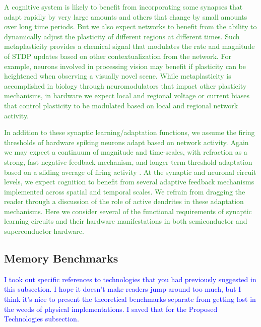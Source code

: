 \documentclass[twocolumn]{article}
\begin{document}
\textcolor{ForestGreen}{A cognitive system is likely to benefit from incorporating some synapses that adapt rapidly by very large amounts and others that change by small amounts over long time periods. But we also expect networks to benefit from the ability to dynamically adjust the plasticity of different regions at different times. Such metaplasticity provides a chemical signal that modulates the rate and magnitude of STDP updates based on other contextualization from the network. For example, neurons involved in processing vision may benefit if plasticity can be heightened when observing a visually novel scene. While metaplasticity is accomplished in biology through neuromodulators that impact other plasticity mechanisms, in hardware we expect local and regional voltage or current biases that control plasticity to be modulated based on local and regional network activity.}

\textcolor{ForestGreen}{In addition to these synaptic learning/adaptation functions, we assume the firing thresholds of hardware spiking neurons adapt based on network activity. Again we may expect a continuum of magnitude and time-scales, with refraction as a strong, fast negative feedback mechanism, and longer-term threshold adaptation based on a sliding average of firing activity \cite{}. At the synaptic and neuronal circuit levels, we expect cognition to benefit from several adaptive feedback mechanisms implemented across spatial and temporal scales. We refrain from dragging the reader through a discussion of the role of active dendrites in these adaptation mechanisms. Here we consider several of the functional requirements of synaptic learning circuits and their hardware manifestations in both semiconductor and superconductor hardware.}

\subsection{Memory Benchmarks}

\textcolor{blue}{I took out specific references to technologies that you had previously suggested in this subsection. I hope it doesn't make readers jump around too much, but I think it's nice to present the theoretical benchmarks separate from getting lost in the weeds of physical implementations. I saved that for the Proposed Technologies subsection.}
\end{document}

